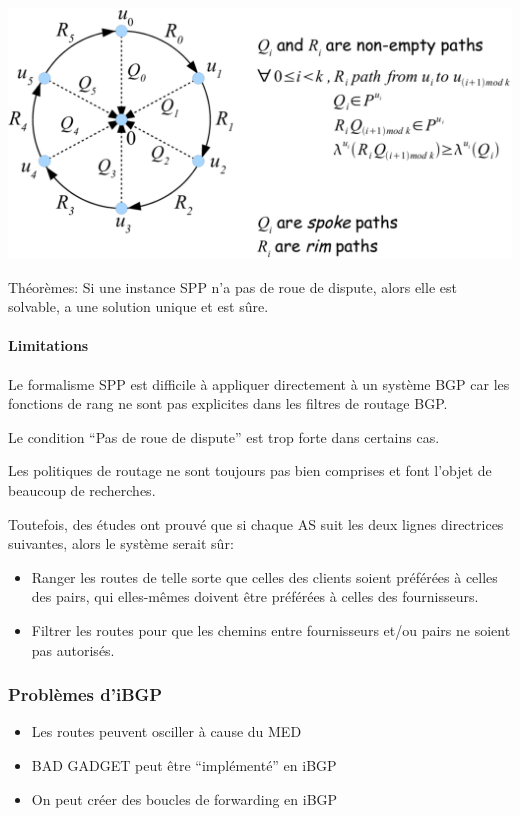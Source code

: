 \documentclass{article}
\begin{document}
\begin{sffamily}
\includegraphics[width=\textwidth]{fab_020.pdf}

Théorèmes: Si une instance SPP n'a pas de roue de dispute, alors elle
est solvable, a une solution unique et est sûre.

\paragraph{Limitations}

Le formalisme SPP est difficile à appliquer directement à un système
BGP car les fonctions de rang ne sont pas explicites dans les filtres
de routage BGP.

Le condition ``Pas de roue de dispute'' est trop forte dans certains
cas.

Les politiques de routage ne sont toujours pas bien comprises et font
l'objet de beaucoup de recherches.

Toutefois, des études ont prouvé que si chaque AS suit les deux lignes
directrices suivantes, alors le système serait sûr:

\begin{itemize}
\item Ranger les routes de telle sorte que celles des clients soient
  préférées à celles des pairs, qui elles-mêmes doivent être préférées
  à celles des fournisseurs.
\item Filtrer les routes pour que les chemins entre fournisseurs et/ou
  pairs ne soient pas autorisés.
\end{itemize}

\subsubsection{Problèmes d'iBGP}

\begin{itemize}
\item Les routes peuvent osciller à cause du MED
\item BAD GADGET peut être ``implémenté'' en iBGP
\item On peut créer des boucles de forwarding en iBGP
\end{itemize}


\end{sffamily}
\end{document}

